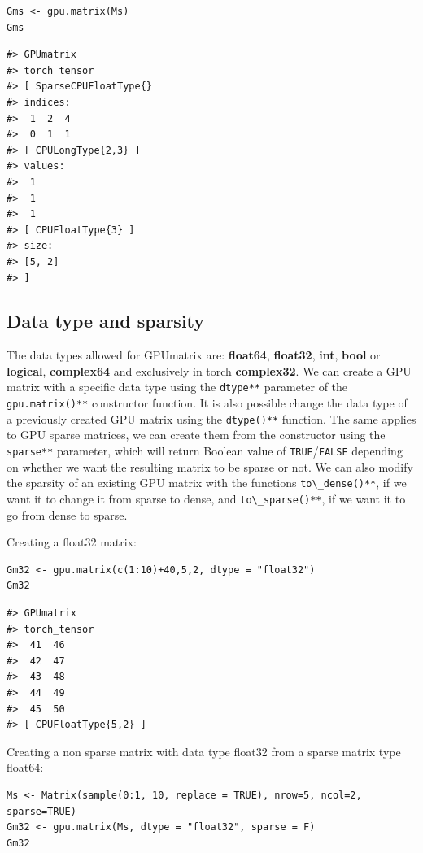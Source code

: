 \begin{verbatim}
Gms <- gpu.matrix(Ms)
Gms
\end{verbatim}

\begin{verbatim}
#> GPUmatrix
#> torch_tensor
#> [ SparseCPUFloatType{}
#> indices:
#>  1  2  4
#>  0  1  1
#> [ CPULongType{2,3} ]
#> values:
#>  1
#>  1
#>  1
#> [ CPUFloatType{3} ]
#> size:
#> [5, 2]
#> ]
\end{verbatim}

\hypertarget{data-type-and-sparsity}{%
\subsection{Data type and sparsity}\label{data-type-and-sparsity}}

The data types allowed for GPUmatrix are: \textbf{float64}, \textbf{float32}, \textbf{int}, \textbf{bool} or \textbf{logical}, \textbf{complex64} and exclusively in torch \textbf{complex32}. We can create a GPU matrix with a specific data type using the \texttt{dtype**} parameter of the \texttt{gpu.matrix()**} constructor function. It is also possible change the data type of a previously created GPU matrix using the \texttt{dtype()**} function. The same applies to GPU sparse matrices, we can create them from the constructor using the \texttt{sparse**} parameter, which will return Boolean value of \texttt{TRUE}/\texttt{FALSE} depending on whether we want the resulting matrix to be sparse or not. We can also modify the sparsity of an existing GPU matrix with the functions \texttt{to\textbackslash{}\_dense()**}, if we want it to change it from sparse to dense, and \texttt{to\textbackslash{}\_sparse()**}, if we want it to go from dense to sparse.

Creating a float32 matrix:

\begin{verbatim}
Gm32 <- gpu.matrix(c(1:10)+40,5,2, dtype = "float32")
Gm32
\end{verbatim}

\begin{verbatim}
#> GPUmatrix
#> torch_tensor
#>  41  46
#>  42  47
#>  43  48
#>  44  49
#>  45  50
#> [ CPUFloatType{5,2} ]
\end{verbatim}

Creating a non sparse matrix with data type float32 from a sparse matrix type float64:

\begin{verbatim}
Ms <- Matrix(sample(0:1, 10, replace = TRUE), nrow=5, ncol=2, sparse=TRUE)
Gm32 <- gpu.matrix(Ms, dtype = "float32", sparse = F)
Gm32
\end{verbatim}

